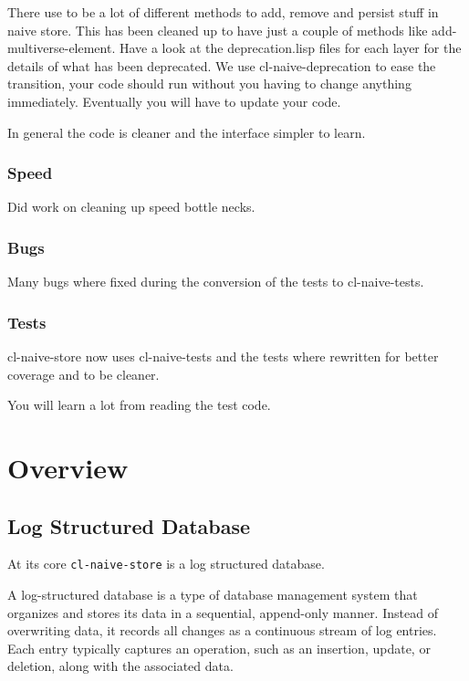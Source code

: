 \documentclass[11pt]{article}
\begin{document}
There use to be a lot of different methods to add, remove and persist
stuff in naive store. This has been cleaned up to have just a couple
of methods like add-multiverse-element. Have a look at the
deprecation.lisp files for each layer for the details of what has been
deprecated. We use cl-naive-deprecation to ease the transition, your
code should run without you having to change anything
immediately. Eventually you will have to update your code.

In general the code is cleaner and the interface simpler to learn.

\subsubsection{Speed}
\label{sec:orgfb06d39}

Did work on cleaning up speed bottle necks.

\subsubsection{Bugs}
\label{sec:orgad2dbfe}

Many bugs where fixed during the conversion of the tests to cl-naive-tests.

\subsubsection{Tests}
\label{sec:org1e2eda0}

cl-naive-store now uses cl-naive-tests and the tests where rewritten
for better coverage and to be cleaner.

You will learn a lot from reading the test code.

\section{Overview}
\label{sec:org2a62f94}

\subsection{Log Structured Database}
\label{sec:org2a580bc}

At its core \texttt{cl-naive-store} is a log structured database.

A log-structured database is a type of database management system that
organizes and stores its data in a sequential, append-only
manner. Instead of overwriting data, it records all changes
as a continuous stream of log entries. Each entry typically captures
an operation, such as an insertion, update, or deletion, along with
the associated data.
\end{document}
